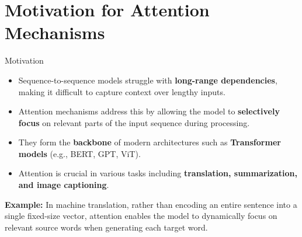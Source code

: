 \section{Motivation for Attention Mechanisms}
\begin{frame}{Motivation}
    \begin{itemize}
        \setlength{\itemsep}{0.5em}
        \item Sequence-to-sequence models struggle with \textbf{long-range dependencies}, making it difficult to capture context over lengthy inputs.
        \item Attention mechanisms address this by allowing the model to \textbf{selectively focus} on relevant parts of the input sequence during processing.
        \item They form the \textbf{backbone} of modern architectures such as \textbf{Transformer models} (e.g., BERT, GPT, ViT).
        \item Attention is crucial in various tasks including \textbf{translation, summarization, and image captioning}.
    \end{itemize}
    \textbf{Example:} In machine translation, rather than encoding an entire sentence into a single fixed-size vector, attention enables the model to dynamically focus on relevant source words when generating each target word.
\end{frame}